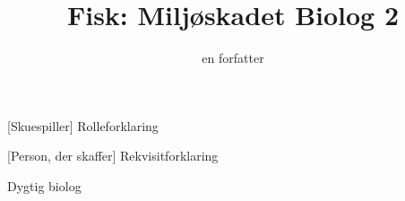 \documentclass[a4paper,11pt]{article}
\title{Fisk: Miljøskadet Biolog 2}
\author{en forfatter}
\begin{document}
\maketitle

\begin{roles}
    [Skuespiller] Rolleforklaring
\end{roles}

\begin{props}
    [Person, der skaffer] Rekvisitforklaring
\end{props}


\begin{sketch}

\scene Dygtig biolog

\end{sketch}
\end{document}
